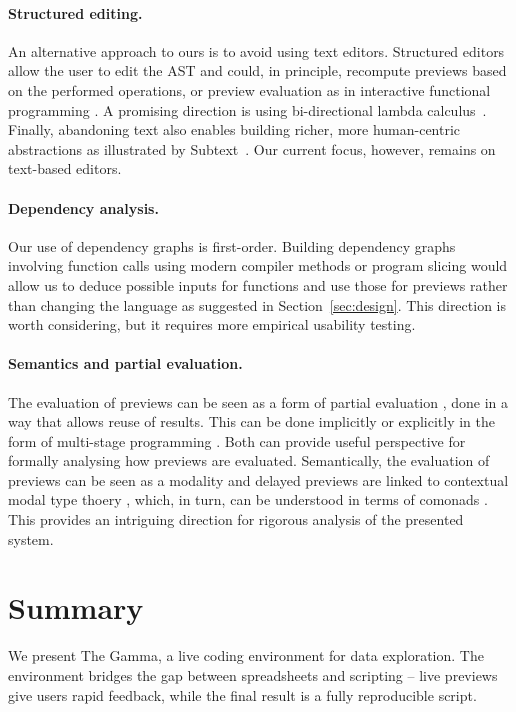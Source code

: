 \documentclass[sigplan,10pt,review,anonymous]{acmart}\settopmatter{printfolios=true,printccs=false,printacmref=false}
\theoremstyle{plain}
\theoremstyle{definition}
\begin{document}
\paragraph{Structured editing.}
An alternative approach to ours is to avoid using text editors. Structured editors 
\cite{structure-based} allow the user to edit the AST and could, in principle, recompute previews
based on the performed operations, or preview evaluation as in interactive functional programming
\cite{interactive}. A promising direction is using bi-directional lambda calculus~\cite{hazelnut}. 
Finally, abandoning text also enables building richer, more human-centric 
abstractions as illustrated by Subtext~\cite{subtext}. Our current focus, however, remains
on text-based editors.

\paragraph{Dependency analysis.}
Our use of dependency graphs \cite{dependencies} is first-order. Building dependency graphs 
involving function calls using modern compiler methods \cite{optimizing} or program slicing 
\cite{slicing} would allow us to deduce possible inputs for functions and use those for 
previews rather than changing the language as suggested in Section~\ref{sec:design}. This direction
is worth considering, but it requires more empirical usability testing.

\paragraph{Semantics and partial evaluation.}
The evaluation of previews can be seen as a form of partial evaluation \cite{partial}, done in a
way that allows reuse of results. This can be done implicitly or explicitly in the form of 
multi-stage programming \cite{metaml}. Both can provide useful perspective for formally analysing
how previews are evaluated. Semantically, the evaluation of previews can be seen as a modality
\cite{modal} and delayed previews are linked to contextual modal type thoery \cite{cmtt}, which, 
in turn, can be understood in terms of comonads \cite{cmtt-denotation}. This provides an intriguing
direction for rigorous analysis of the presented system.


\section{Summary}
We present The Gamma, a live coding environment for data exploration. The environment
bridges the gap between spreadsheets and scripting -- live previews give users rapid feedback, 
while the final result is a fully reproducible script.
\end{document}
